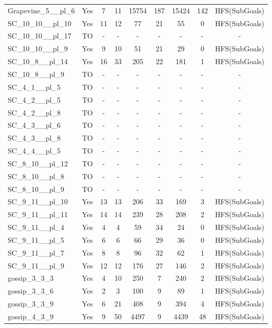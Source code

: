\documentclass{article}
\begin{document}
\begin{tabular}{lcccccccc}
Grapevine\_5\_\_pl\_6 & Yes & 7 & 11 & 15754 & 187 & 15424 & 142 & HFS(SubGoals) \\
SC\_10\_10\_\_pl\_10 & Yes & 11 & 12 & 77 & 21 & 55 & 0 & HFS(SubGoals) \\
SC\_10\_10\_\_pl\_17 & TO & - & - & - & - & - & - & - \\
SC\_10\_10\_\_pl\_9 & Yes & 9 & 10 & 51 & 21 & 29 & 0 & HFS(SubGoals) \\
SC\_10\_8\_\_pl\_14 & Yes & 16 & 33 & 205 & 22 & 181 & 1 & HFS(SubGoals) \\
SC\_10\_8\_\_pl\_9 & TO & - & - & - & - & - & - & - \\
SC\_4\_1\_\_pl\_5 & TO & - & - & - & - & - & - & - \\
SC\_4\_2\_\_pl\_5 & TO & - & - & - & - & - & - & - \\
SC\_4\_2\_\_pl\_8 & TO & - & - & - & - & - & - & - \\
SC\_4\_3\_\_pl\_6 & TO & - & - & - & - & - & - & - \\
SC\_4\_3\_\_pl\_8 & TO & - & - & - & - & - & - & - \\
SC\_4\_4\_\_pl\_5 & TO & - & - & - & - & - & - & - \\
SC\_8\_10\_\_pl\_12 & TO & - & - & - & - & - & - & - \\
SC\_8\_10\_\_pl\_8 & TO & - & - & - & - & - & - & - \\
SC\_8\_10\_\_pl\_9 & TO & - & - & - & - & - & - & - \\
SC\_9\_11\_\_pl\_10 & Yes & 13 & 13 & 206 & 33 & 169 & 3 & HFS(SubGoals) \\
SC\_9\_11\_\_pl\_11 & Yes & 14 & 14 & 239 & 28 & 208 & 2 & HFS(SubGoals) \\
SC\_9\_11\_\_pl\_4 & Yes & 4 & 4 & 59 & 34 & 24 & 0 & HFS(SubGoals) \\
SC\_9\_11\_\_pl\_5 & Yes & 6 & 6 & 66 & 29 & 36 & 0 & HFS(SubGoals) \\
SC\_9\_11\_\_pl\_7 & Yes & 8 & 8 & 96 & 32 & 62 & 1 & HFS(SubGoals) \\
SC\_9\_11\_\_pl\_9 & Yes & 12 & 12 & 176 & 27 & 146 & 2 & HFS(SubGoals) \\
gossip\_3\_3\_3 & Yes & 4 & 10 & 250 & 7 & 240 & 2 & HFS(SubGoals) \\
gossip\_3\_3\_6 & Yes & 2 & 3 & 100 & 9 & 89 & 1 & HFS(SubGoals) \\
gossip\_3\_3\_9 & Yes & 6 & 21 & 408 & 9 & 394 & 4 & HFS(SubGoals) \\
gossip\_4\_3\_9 & Yes & 9 & 50 & 4497 & 9 & 4439 & 48 & HFS(SubGoals) \\

\end{tabular}
\end{document}
